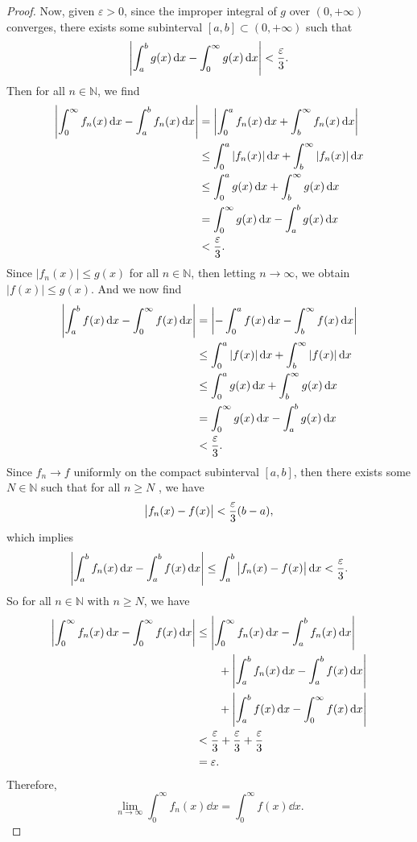 \documentclass[12pt]{article}
\theoremstyle{definition}
\newcommand{\N}{\mathbb{N}}
\newcommand{\eps}{\varepsilon}
\begin{document}
\begin{proof}
    Now, given $\eps > 0$, since the improper integral of $g$ over $(0, +\infty)$ converges, there exists some subinterval $[a, b] \subset (0, +\infty)$ such that
    \[
        \abs{\int_{a}^{b} g(x) \dd{x} - \int_{0}^{\infty} g(x) \dd{x}} < \frac{\eps}{3}.
    \]
    Then for all $n \in \N$, we find
    \begin{align*}
        \abs{\int_{0}^{\infty} f_n(x) \dd{x} - \int_{a}^{b} f_n(x) \dd{x}}
            &= \abs{\int_{0}^{a} f_n(x) \dd{x} + \int_{b}^{\infty} f_n(x) \dd{x}} \\
            &\leq \int_{0}^{a} \abs{f_n(x)} \dd{x} + \int_{b}^{\infty} \abs{f_n(x)} \dd{x} \\
            &\leq \int_{0}^{a} g(x) \dd{x} + \int_{b}^{\infty} g(x) \dd{x} \\
            &= \int_{0}^{\infty} g(x) \dd{x} - \int_{a}^{b} g(x) \dd{x} \\
            &< \frac{\eps}{3}.
    \end{align*}
    Since $|f_n(x)| \leq g(x)$ for all $n \in \N$, then letting $n \to \infty$, we obtain $|f(x)| \leq g(x)$. And we now find
    \begin{align*}
        \abs{\int_{a}^{b} f(x) \dd{x} - \int_{0}^{\infty} f(x) \dd{x}}
            &= \abs{-\int_{0}^{a} f(x) \dd{x} - \int_{b}^{\infty} f(x) \dd{x}} \\
            &\leq \int_{0}^{a} \abs{f(x)} \dd{x} + \int_{b}^{\infty} \abs{f(x)} \dd{x} \\
            &\leq \int_{0}^{a} g(x) \dd{x} + \int_{b}^{\infty} g(x) \dd{x} \\
            &= \int_{0}^{\infty} g(x) \dd{x} - \int_{a}^{b} g(x) \dd{x} \\
            &< \frac{\eps}{3}.
    \end{align*}
    Since $f_n \to f$ uniformly on the compact subinterval $[a, b]$, then there exists some $N \in \N$ such that for all $n \geq N$ , we have
    \[
        \abs\big{f_n(x) - f(x)} < \frac{\eps}{3}(b - a),
    \]
    which implies
    \[
        \abs{\int_{a}^{b} f_n(x) \dd{x} - \int_{a}^{b} f(x) \dd{x}}
            \leq \int_{a}^{b} \abs\big{f_n(x) - f(x)} \dd{x}
            < \frac{\eps}{3}.
    \]
    So for all $n \in \N$ with $n \geq N$, we have
    \begin{align*}
        \abs{\int_{0}^{\infty} f_n(x) \dd{x} - \int_{0}^{\infty} f(x) \dd{x}}
            &\leq \abs{\int_{0}^{\infty} f_n(x) \dd{x} - \int_{a}^{b} f_n(x) \dd{x}} \\
                &\qquad + \abs{\int_{a}^{b} f_n(x) \dd{x} - \int_{a}^{b} f(x) \dd{x}} \\
                &\qquad + \abs{\int_{a}^{b} f(x) \dd{x} - \int_{0}^{\infty} f(x) \dd{x}} \\
            &< \frac{\eps}{3} + \frac{\eps}{3} + \frac{\eps}{3} \\
            &= \eps.
    \end{align*}
    Therefore,
    \[
        \lim_{n \to \infty} \int_{0}^{\infty} f_n(x) \dd{x} = \int_{0}^{\infty} f(x) \dd{x}.
    \]
    
\end{proof}
\end{document}
